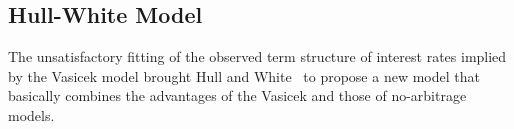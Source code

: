 %
%
%
%
%
%
%
%
%
%

\subsection{Hull-White Model}
\label{hull-white-model}
The unsatisfactory fitting of the observed term structure of interest rates implied by the Vasicek model brought Hull and White~\cite{bib:hull_white_model} to propose a new model that basically combines the advantages of the Vasicek 
and those of no-arbitrage models.

